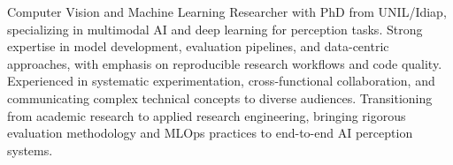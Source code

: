 


\begin{cvparagraph}
Computer Vision and Machine Learning Researcher with PhD from UNIL/Idiap, specializing in multimodal AI and deep learning for perception tasks. Strong expertise in model development, evaluation pipelines, and data-centric approaches, with emphasis on reproducible research workflows and code quality. Experienced in systematic experimentation, cross-functional collaboration, and communicating complex technical concepts to diverse audiences. Transitioning from academic research to applied research engineering, bringing rigorous evaluation methodology and MLOps practices to end-to-end AI perception systems.
\end{cvparagraph}
